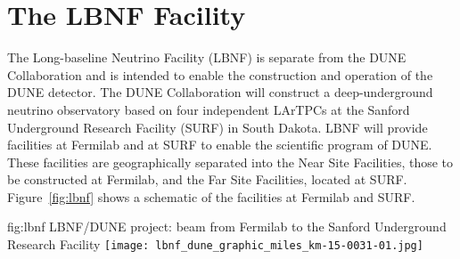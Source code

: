 


\section{The LBNF Facility} %

The Long-baseline Neutrino
Facility (LBNF) is separate from the DUNE Collaboration and is intended to enable the construction and operation of the DUNE detector.
The DUNE Collaboration will construct a deep-underground neutrino observatory based on four independent  LArTPCs at the Sanford Underground Research Facility (SURF) in South Dakota.
LBNF will provide facilities at Fermilab and at SURF to enable the scientific program of DUNE.
These facilities are geographically separated into the Near Site Facilities, those to be constructed
at Fermilab, and the Far Site Facilities, located at SURF. Figure~\ref{fig:lbnf} shows
a schematic of the facilities at Fermilab and SURF. 

\begin{dunefigure}{fig:lbnf}{ 	
LBNF/DUNE project: beam from Fermilab to the Sanford Underground Research Facility}
\texttt{[image: lbnf\_dune\_graphic\_miles\_km-15-0031-01.jpg]}
\end{dunefigure}

